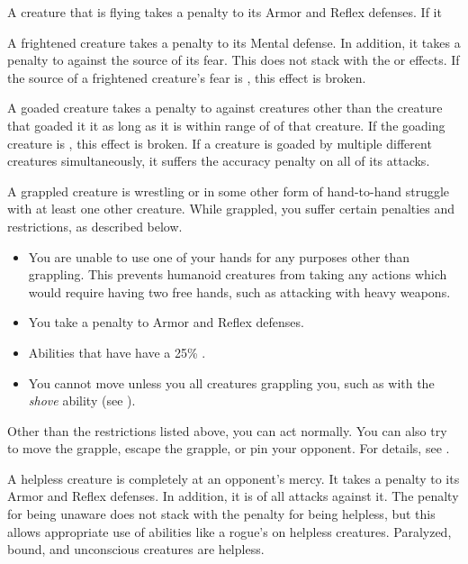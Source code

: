      A creature that is flying takes a  penalty to its Armor and Reflex defenses.
    If it 

     A frightened creature takes a  penalty to its Mental defense.
    In addition, it takes a  penalty to  against the source of its fear.
    This does not stack with the \shaken or \panicked effects.
    If the source of a frightened creature's fear is , this effect is broken.

     A goaded creature takes a  penalty to  against creatures other than the creature that goaded it it as long as it is within \rngmed range of of that creature.
    If the goading creature is , this effect is broken.
    If a creature is goaded by multiple different creatures simultaneously, it suffers the accuracy penalty on all of its attacks.

     A grappled creature is wrestling or in some other form of hand-to-hand struggle with at least one other creature.
    While grappled, you suffer certain penalties and restrictions, as described below.
    \begin{itemize}
        \item You are unable to use one of your hands for any purposes other than grappling.
            This prevents humanoid creatures from taking any actions which would require having two free hands, such as attacking with heavy weapons.
        \item You take a  penalty to Armor and Reflex defenses.
        \item Abilities that have  have a 25\% .
        \item You cannot move unless you  all creatures grappling you, such as with the \textit{shove} ability (see ).
    \end{itemize}

    Other than the restrictions listed above, you can act normally. You can also try to move the grapple, escape the grapple, or pin your opponent. For details, see .

     A helpless creature is completely at an opponent's mercy.
    It takes a  penalty to its Armor and Reflex defenses.
    In addition, it is \unaware of all attacks against it.
    The penalty for being unaware does not stack with the penalty for being helpless, but this allows appropriate use of abilities like a rogue's  on helpless creatures.
    Paralyzed, bound, and unconscious creatures are helpless.

